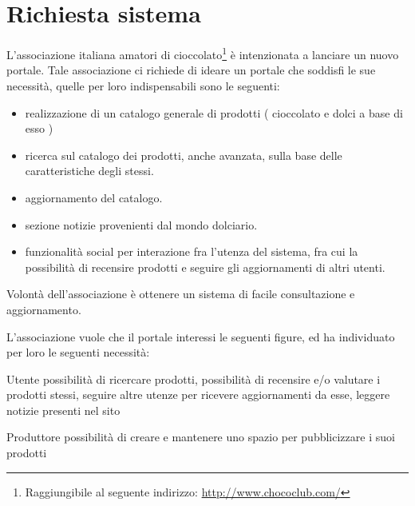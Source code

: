 \chapter{Richiesta sistema}

L’associazione italiana amatori di cioccolato\footnote{Raggiungibile al seguente indirizzo: \url{http://www.chococlub.com/}} è intenzionata a lanciare un nuovo portale.
Tale associazione ci richiede di ideare un portale che soddisfi le sue necessità, quelle per loro indispensabili sono le seguenti:
\begin{itemize}
	\item realizzazione di un catalogo generale di prodotti ( cioccolato e dolci a base di esso ) 
	\item ricerca sul catalogo dei prodotti, anche avanzata, sulla base delle caratteristiche degli stessi.
	\item aggiornamento del catalogo.
	\item sezione notizie provenienti dal mondo dolciario.
	\item funzionalità social per interazione fra l'utenza del sistema, fra cui la possibilità di recensire prodotti e seguire gli aggiornamenti di altri utenti.
\end{itemize}
Volontà dell'associazione è ottenere un sistema di facile consultazione e aggiornamento.

L'associazione vuole che il portale interessi le seguenti figure, ed ha individuato per loro le seguenti necessità:
\begin{descriptionInd}
	\item[Utente] possibilità di ricercare prodotti, possibilità di recensire e/o valutare i prodotti stessi, seguire altre utenze per ricevere aggiornamenti da esse, leggere notizie presenti nel sito
	\item[Produttore] possibilità di creare e mantenere uno spazio per pubblicizzare i suoi prodotti
\end{descriptionInd}




